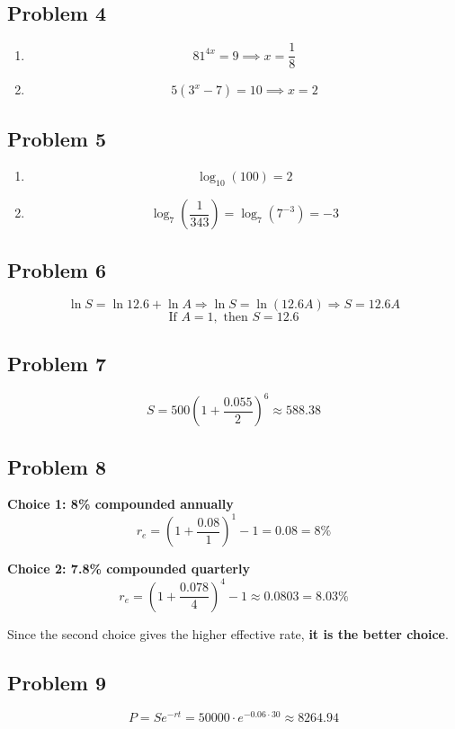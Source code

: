 \documentclass[12pt]{article}
\begin{document}
\subsection*{Problem 4}
\begin{enumerate}[label=(\alph*)]
    \item 
    \[
    81^{4x} =9 \implies x= \boxed{\dfrac{1}{8}}
    \]

    \item 
    \[
    5(3^x - 7) = 10 \implies x = \boxed{2}
    \]
\end{enumerate}

\subsection*{Problem 5}
\begin{enumerate}[label=(\alph*)]
    \item 
    \[
    \log_{10}(100) = \boxed{2}
    \]

    \item 
    \[
    \log_{7}\left(\dfrac{1}{343}\right) = \log_{7}(7^{-3}) = \boxed{-3}
    \]
\end{enumerate}

\subsection*{Problem 6}
\[
\ln S = \ln 12.6 + \ln A \Rightarrow \ln S = \ln(12.6A) \Rightarrow S = 12.6A
\]
\[
\text{If } A = 1, \text{ then } S = \boxed{12.6}
\]

\subsection*{Problem 7}
\[
S = 500\left(1 + \dfrac{0.055}{2}\right)^6 \approx \boxed{588.38}
\]

\subsection*{Problem 8}
\textbf{Choice 1: 8\% compounded annually}
\[
r_e = \left(1 + \dfrac{0.08}{1}\right)^1 - 1 = 0.08 = \boxed{8\%}
\]

\textbf{Choice 2: 7.8\% compounded quarterly}
\[
r_e = \left(1 + \dfrac{0.078}{4}\right)^4 - 1 \approx 0.0803 = \boxed{8.03\%}
\]

Since the second choice gives the higher effective rate, \textbf{it is the better choice}.

\subsection*{Problem 9}
\[
P = Se^{-rt} = 50000 \cdot e^{-0.06 \cdot 30}  \approx \boxed{8264.94}
\]
\end{document}
